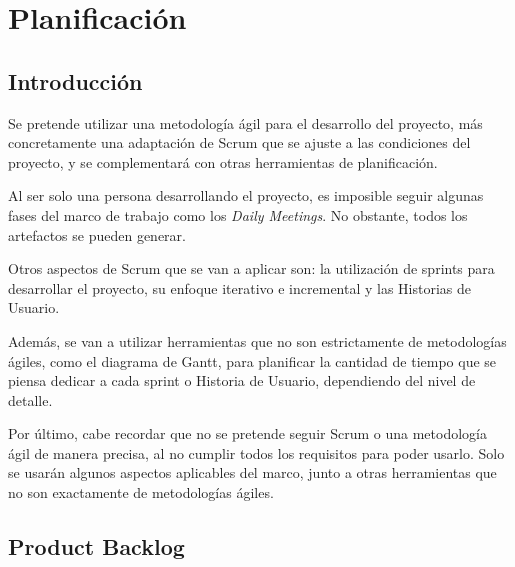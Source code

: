 \chapter{Planificación}

\section{Introducción}

Se pretende utilizar una metodología ágil para el desarrollo del proyecto, más concretamente una adaptación de Scrum que se ajuste a las condiciones del proyecto, y se complementará con otras herramientas de planificación.

\bigskip

Al ser solo una persona desarrollando el proyecto, es imposible seguir algunas fases del marco de trabajo como los \textit{Daily Meetings}. No obstante, todos los artefactos se pueden generar.

\bigskip

Otros aspectos de Scrum que se van a aplicar son: la utilización de sprints para desarrollar el proyecto, su enfoque iterativo e incremental y las Historias de Usuario.

\bigskip

Además, se van a utilizar herramientas que no son estrictamente de metodologías ágiles, como el diagrama de Gantt, para planificar la cantidad de tiempo que se piensa dedicar a cada sprint o Historia de Usuario, dependiendo del nivel de detalle. 

\bigskip

Por último, cabe recordar que no se pretende seguir Scrum o una metodología ágil de manera precisa, al no cumplir todos los requisitos para poder usarlo. Solo se usarán algunos aspectos aplicables del marco, junto a otras herramientas que no son exactamente de metodologías ágiles.


\section{Product Backlog}

